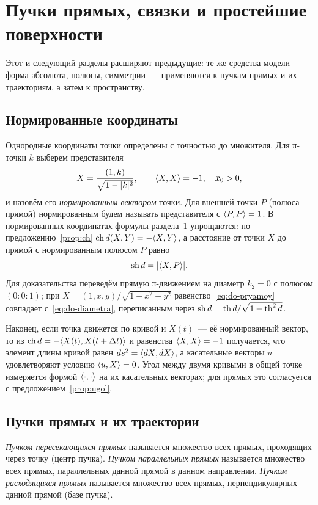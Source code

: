 \section{Пучки прямых, связки и простейшие поверхности}

Этот и следующий разделы расширяют предыдущие: те же средства модели~--- форма абсолюта, полюсы, симметрии~--- применяются к пучкам прямых и их траекториям, а затем к пространству.

\subsection{Нормированные координаты}

Однородные координаты точки определены с точностью до множителя. Для π-точки $k$ выберем представителя
\begin{equation}\label{eq:norm}
X=\frac{(1,k)}{\sqrt{1-|k|^2}},\qquad \langle X,X\rangle=-1,\quad x_0>0,
\end{equation}
и назовём его \emph{нормированным вектором} точки. Для внешней точки $P$ (полюса прямой) нормированным будем называть представителя с $\langle P,P\rangle=1$. В нормированных координатах формулы раздела~1 упрощаются: по предложению~\ref{prop:ch} $\operatorname{ch} d(X,Y)=-\langle X,Y\rangle$, а расстояние от точки $X$ до прямой с нормированным полюсом $P$ равно
\begin{equation}\label{eq:do-pryamoy}
\operatorname{sh} d=|\langle X,P\rangle|.
\end{equation}
Для доказательства переведём прямую π-движением на диаметр $k_2=0$ с полюсом $(0:0:1)$; при $X=(1,x,y)/\sqrt{1-x^2-y^2}$ равенство~\eqref{eq:do-pryamoy} совпадает с~\eqref{eq:do-diametra}, переписанным через $\operatorname{sh} d=\operatorname{th} d/\sqrt{1-\operatorname{th}^2 d}$.

Наконец, если точка движется по кривой и $X(t)$~--- её нормированный вектор, то из $\operatorname{ch} d=-\langle X(t),X(t+\Delta t)\rangle$ и равенства $\langle X,X\rangle=-1$ получается, что элемент длины кривой равен $ds^2=\langle dX,dX\rangle$, а касательные векторы $u$ удовлетворяют условию $\langle u,X\rangle=0$. Угол между двумя кривыми в общей точке измеряется формой $\langle \cdot,\cdot\rangle$ на их касательных векторах; для прямых это согласуется с предложением~\ref{prop:ugol}.

\subsection{Пучки прямых и их траектории}

\begin{definition}[\!\!{[1]}]
\emph{Пучком пересекающихся прямых} называется множество всех прямых, проходящих через точку (центр пучка). \emph{Пучком параллельных прямых} называется множество всех прямых, параллельных данной прямой в данном направлении. \emph{Пучком расходящихся прямых} называется множество всех прямых, перпендикулярных данной прямой (базе пучка).
\end{definition}

